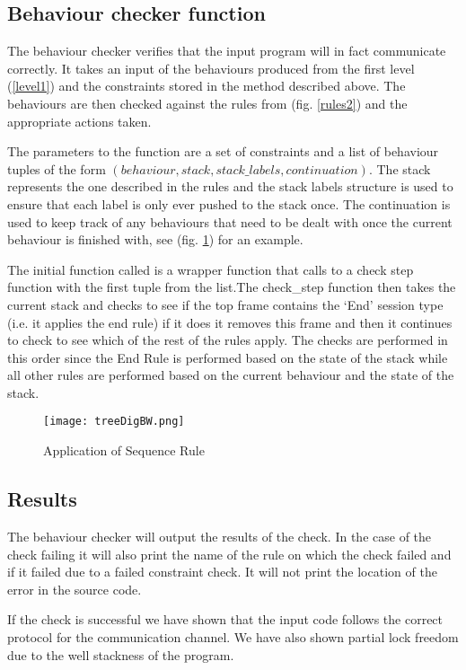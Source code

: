 \subsection{Behaviour checker function}

The behaviour checker verifies that the input program will in fact communicate correctly. It takes an input of the behaviours produced from the first level (\ref{level1}) and the constraints stored in the method described above. The behaviours are then checked against the rules from (fig. \ref{rules2}) and the appropriate actions taken. 

The parameters to the function are a set of constraints and a list of behaviour tuples of the form $(behaviour, stack, stack\_labels, continuation)$. The stack represents the one described in the rules and the stack labels structure is used to ensure that each label is only ever pushed to the stack once. The continuation is used to keep track of any behaviours that need to be dealt with once the current behaviour is finished with, see (fig. \ref{seq}) for an example. 

The initial function called is a wrapper function that calls to a check step function with the first tuple from the list.The check_step function then takes the current stack and checks to see if the top frame contains the `End' session type (i.e. it applies the end rule) if it does it removes this frame and then it continues to check to see which of the rest of the rules apply. The checks are performed in this order since the End Rule is performed based on the state of the stack while all other rules are performed based on the current behaviour and the state of the stack. 

\begin{figure}
\texttt{[image: treeDigBW.png]}
\caption{Application of Sequence Rule}
\label{seq}
\end{figure}

\subsection{Results}
The behaviour checker will output the results of the check. In the case of the check failing it will also print the name of the rule on which the check failed and if it failed due to a failed constraint check. It will not print the location of the error in the source code.

If the check is successful we have shown that the input code follows the correct protocol for the communication channel. We have also shown partial lock freedom due to the well stackness of the program. 

